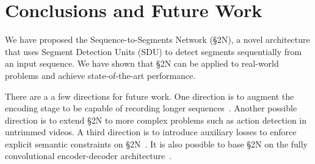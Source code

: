 \documentclass[10pt,journal,compsoc]{IEEEtran}
\begin{document}


















\section{Conclusions and Future Work}
We have proposed the Sequence-to-Segments Network (\S2N), a novel architecture that uses Segment Detection Units (SDU) to detect segments sequentially from an input sequence. We have shown that \S2N can be applied to real-world problems and achieve state-of-the-art performance.

There are a a few directions for future work. One direction is to augment the encoding stage to be capable of recording longer sequences~\cite{li2018independently}. Another possible direction is to extend \S2N to more complex problems such as action detection in untrimmed videos. A third  direction is to introduce auxiliary losses to enforce explicit semantic constraints on \S2N~\cite{buch2017end}.  It is also possible to base \S2N on the fully convolutional encoder-decoder architecture~\cite{gehring2017convolutional,vaswani2017attention}. 

%
\end{document}

